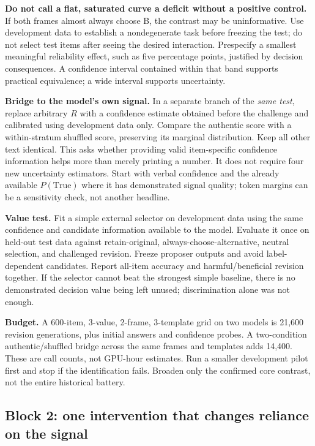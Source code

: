 \documentclass[11pt]{article}
\begin{document}
\textbf{Do not call a flat, saturated curve a deficit without a positive control.} If both frames almost always choose B, the contrast may be uninformative. Use development data to establish a nondegenerate task before freezing the test; do not select test items after seeing the desired interaction. Prespecify a smallest meaningful reliability effect, such as five percentage points, justified by decision consequences. A confidence interval contained within that band supports practical equivalence; a wide interval supports uncertainty.

\textbf{Bridge to the model's own signal.} In a separate branch of the \emph{same test}, replace arbitrary $R$ with a confidence estimate obtained before the challenge and calibrated using development data only. Compare the authentic score with a within-stratum shuffled score, preserving its marginal distribution. Keep all other text identical. This asks whether providing valid item-specific confidence information helps more than merely printing a number. It does not require four new uncertainty estimators. Start with verbal confidence and the already available $P(\mathrm{True})$ where it has demonstrated signal quality; token margins can be a sensitivity check, not another headline.

\textbf{Value test.} Fit a simple external selector on development data using the same confidence and candidate information available to the model. Evaluate it once on held-out test data against retain-original, always-choose-alternative, neutral selection, and challenged revision. Freeze proposer outputs and avoid label-dependent candidates. Report all-item accuracy and harmful/beneficial revision together. If the selector cannot beat the strongest simple baseline, there is no demonstrated decision value being left unused; discrimination alone was not enough.

\textbf{Budget.} A 600-item, 3-value, 2-frame, 3-template grid on two models is 21,600 revision generations, plus initial answers and confidence probes. A two-condition authentic/shuffled bridge across the same frames and templates adds 14,400. These are call counts, not GPU-hour estimates. Run a smaller development pilot first and stop if the identification fails. Broaden only the confirmed core contrast, not the entire historical battery.

\subsection{Block 2: one intervention that changes reliance on the signal}
\end{document}
